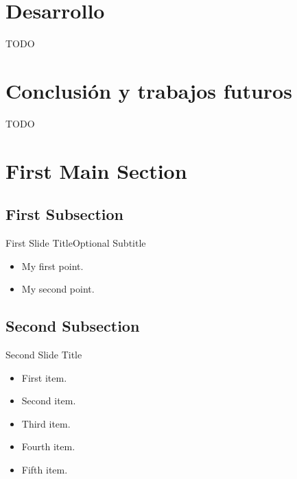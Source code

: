 \documentclass{beamer}
\begin{document}
\section{Desarrollo}
\begin{frame}{TODO}{}

\end{frame}

\section{Conclusión y trabajos futuros}
\begin{frame}{TODO}{}

\end{frame}

\section{First Main Section}

\subsection{First Subsection}

\begin{frame}{First Slide Title}{Optional Subtitle}
    \begin{itemize}
        \item {
                My first point.
            }
        \item {
                My second point.
            }
    \end{itemize}
\end{frame}

\subsection{Second Subsection}

\begin{frame}{Second Slide Title}
    \begin{itemize}
        \item {
                First item.
                \pause %
            }
        \item {   
                Second item.
            }
        \item<3-> {
                Third item.
            }
        \item<4-> {
                Fourth item.
            }
        \item<5-> {
                Fifth item. 
            }
    \end{itemize}
\end{frame}
\end{document}
